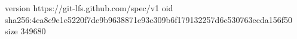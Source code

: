 version https://git-lfs.github.com/spec/v1
oid sha256:4ca8e9e1e5220f7de9b9638871e93c309b6f179132257d6c530763ecda156f50
size 349680
